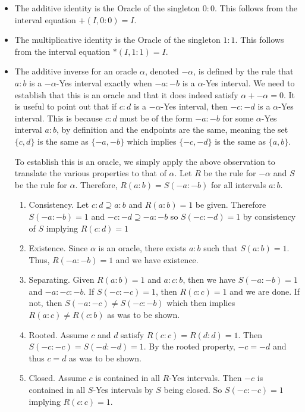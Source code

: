 \documentclass[12pt]{article}
\theoremstyle{remark}
\begin{document}
\begin{itemize}
    \item The additive identity is the Oracle of the singleton $0:0$. This follows from the interval equation $+(I, 0:0) = I$.
    \item The multiplicative identity is the Oracle of the singleton $1:1$. This follows from the interval equation $*(I, 1:1) = I$.
    \item The additive inverse for an oracle $\alpha$, denoted $-\alpha$, is defined by the rule that $a:b$ is a $-\alpha$-Yes interval exactly when $-a:-b$ is a $\alpha$-Yes interval. We need to establish that this is an oracle and that it does indeed satisfy $\alpha + -\alpha = 0$. 
    It is useful to point out that if $c:d$ is a $-\alpha$-Yes interval, then $-c:-d$ is a $\alpha$-Yes interval. This is because $c:d$ must be of the form $-a:-b$ for some $\alpha$-Yes interval $a:b$, by definition and the endpoints are the same, meaning the set $\{c,d\}$ is the same as $\{-a, -b\}$ which implies $\{-c, -d\}$ is the same as $\{a, b\}$.
    
    To establish this is an oracle, we simply apply the above observation to translate the various properties to that of $\alpha$. Let $R$ be the rule for $-\alpha$ and $S$ be the rule for $\alpha$. Therefore, $R(a:b)=S(-a:-b)$ for all intervals $a:b$.
    
    \begin{enumerate}
        \item Consistency. Let $c:d \supseteq a:b$ and $R(a:b)=1$ be given. Therefore $S(-a:-b) = 1$ and $-c:-d \supseteq -a:-b$ so $S(-c:-d)=1$ by consistency of $S$ implying $R(c:d) = 1$
        \item Existence. Since $\alpha$ is an oracle, there exists $a:b$ such that $S(a:b)=1$. Thus, $R(-a:-b)=1$ and we have existence. 
        \item Separating. Given $R(a:b)=1$ and $a:c:b$, then we have $S(-a:-b)=1$ and $-a:-c:-b$. If $S(-c:-c)=1$, then $R(c:c)=1$ and we are done. If not, then $S(-a:-c) \neq S(-c:-b)$ which then implies $R(a:c)\neq R(c:b)$ as was to be shown. 
        \item Rooted. Assume $c$ and $d$ satisfy $R(c:c)=R(d:d)=1$. Then $S(-c:-c)=S(-d:-d)=1$. By the rooted property, $-c = -d$ and thus $c=d$ as was to be shown. 
        \item Closed. Assume $c$ is contained in all $R$-Yes intervals. Then $-c$ is contained in all $S$-Yes intervals by $S$ being closed. So $S(-c:-c)=1$ implying $R(c:c)=1$.
    \end{enumerate}
    

\end{itemize}
\end{document}
